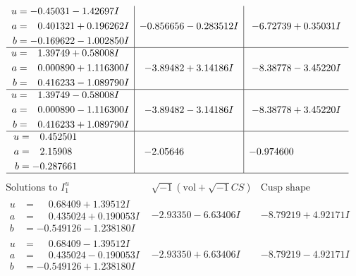 \documentclass[1p]{elsarticle_modified}
\theoremstyle{definition}
\newcommand{\I}{\sqrt{-1}}
\begin{document}
$$\begin{array}{c|c|c}
\begin{aligned}
u &= -0.45031 - 1.42697 I \\
a &= \phantom{-}0.401321 + 0.196262 I \\
b &= -0.169622 - 1.002850 I\end{aligned}
 & -0.856656 - 0.283512 I & -6.72739 + 0.35031 I \\ \hline\begin{aligned}
u &= \phantom{-}1.39749 + 0.58008 I \\
a &= \phantom{-}0.000890 + 1.116300 I \\
b &= \phantom{-}0.416233 - 1.089790 I\end{aligned}
 & -3.89482 + 3.14186 I & -8.38778 - 3.45220 I \\ \hline\begin{aligned}
u &= \phantom{-}1.39749 - 0.58008 I \\
a &= \phantom{-}0.000890 - 1.116300 I \\
b &= \phantom{-}0.416233 + 1.089790 I\end{aligned}
 & -3.89482 - 3.14186 I & -8.38778 + 3.45220 I \\ \hline\begin{aligned}
u &= \phantom{-}0.452501\phantom{ +0.000000I} \\
a &= \phantom{-}2.15908\phantom{ +0.000000I} \\
b &= -0.287661\phantom{ +0.000000I}\end{aligned}
 & -2.05646\phantom{ +0.000000I} & -0.974600\phantom{ +0.000000I}\\
 \hline 
 \end{array}$$\newpage$$\begin{array}{c|c|c}  
\text{Solutions to }I^u_{1}& \I (\text{vol} + \sqrt{-1}CS) & \text{Cusp shape}\\
 \hline 
\begin{aligned}
u &= \phantom{-}0.68409 + 1.39512 I \\
a &= \phantom{-}0.435024 + 0.190053 I \\
b &= -0.549126 - 1.238180 I\end{aligned}
 & -2.93350 - 6.63406 I & -8.79219 + 4.92171 I \\ \hline\begin{aligned}
u &= \phantom{-}0.68409 - 1.39512 I \\
a &= \phantom{-}0.435024 - 0.190053 I \\
b &= -0.549126 + 1.238180 I\end{aligned}
 & -2.93350 + 6.63406 I & -8.79219 - 4.92171 I \\ \hline\begin{aligned}

\end{aligned}
\end{array}$$
\end{document}
